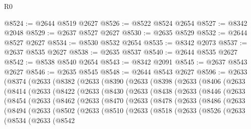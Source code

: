 \begin{lexlean}{R0}
\begin{coremodule}
@8524 := @2644 @8519 @2627
@8526 := @8522 @8524 @2654
@8527 := @8342 @2048
@8529 := @2637 @8527 @2627
@8530 := @2635 @8529
@8532 := @2644 @8527 @2627
@8534 := @8530 @8532 @2654
@8535 := @8342 @2073
@8537 := @2637 @8535 @2627
@8538 := @2635 @8537
@8540 := @2644 @8535 @2627
@8542 := @8538 @8540 @2654
@8543 := @8342 @2091
@8545 := @2637 @8543 @2627
@8546 := @2635 @8545
@8548 := @2644 @8543 @2627
@8596 := @2633
    (@8374
      (@2633
        (@8382
          (@2633
            (@8390
              (@2633
                (@8398
                  (@2633
                    (@8406
                      (@2633
                        (@8414
                          (@2633
                            (@8422
                              (@2633
                                (@8430
                                  (@2633
                                    (@8438
                                      (@2633
                                        (@8446
                                          (@2633
                                            (@8454
                                              (@2633
                                                (@8462
                                                  (@2633
                                                    (@8470
                                                      (@2633
                                                        (@8478
                                                          (@2633
                                                            (@8486
                                                              (@2633
                                                                (@8494
                                                                  (@2633
                                                                    (@8502
                                                                      (@2633
                                                                        (@8510
                                                                          (@2633
                                                                            (@8518
                                                                              (@2633
                                                                                (@8526
                                                                                  (@2633
                                                                                    (@8534
                                                                                      (@2633
                                                                                        (@8542

\end{coremodule}
\end{lexlean}
